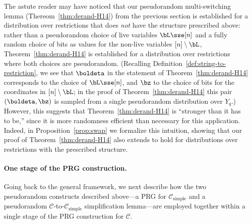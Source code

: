 \documentclass{toc}
\theoremstyle{plain}
\newcommand{\simple}{\mathrm{simple}}
\begin{document}
 The astute reader may have noticed that our pseudorandom multi-switching lemma (Thereom~\ref{thm:derand-H14}) from the previous section is established for a distribution over restrictions that does \emph{not} have the structure prescribed above: rather than a pseudorandom choice of live variables $\bL \sse [n]$ and a fully random choice of bits as values for the non-live variables ${[n] \setminus \bL}$, Theorem~\ref{thm:derand-H14} is established for a distribution over restrictions where both choices are pseudorandom. (Recalling Definition~\ref{def:string-to-restriction}, we see that $\boldeta$ in the statement of Theorem~\ref{thm:derand-H14} corresponds to the choice of $\bL \sse [n]$, and $\bz$ to the choice of bits for the coordinates in $[n] \setminus \bL$; in the proof of Theorem~\ref{thm:derand-H14} this pair $(\boldeta,\bz)$ is sampled from a single pseudorandom distribution over $Y_q$.)  However, this suggests that Theorem~\ref{thm:derand-H14} is ``stronger than it has to be,'' since it is more randomness efficient than necessary for this application. Indeed, in Proposition~\ref{prop:swap} we formalize this intuition, showing that our proof of Theorem~\ref{thm:derand-H14} also extends to hold for distributions over restrictions with the prescribed structure.


\vspace{-5pt}

\paragraph{One stage of the PRG construction.}  Going back to the general framework, we next describe how the two pseudorandom constructs described above---a PRG for $\mathscr{C}_\simple$ and a pseudorandom $\mathscr{C}$-to-$\mathscr{C}_\simple$ simplification lemma---are employed together within a single stage of the PRG construction for $\mathscr{C}$. 
\end{document}
